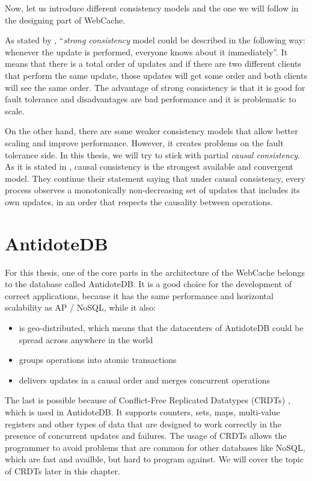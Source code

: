 Now, let us introduce different consistency models and the one we will follow in the designing part of WebCache. 

As stated by \citet{10}, ``\textit{strong consistency} model could be described in the following way: whenever the update is performed, everyone knows about it immediately''. It means that there is a total order of updates and if there are two different clients that perform the same update, those updates will get some order and both clients will see the same order. The advantage of strong consistency is that it is good for fault tolerance and disadvantages are bad performance and it is problematic to scale.

On the other hand, there are some weaker consistency models that allow better scaling and improve performance. However, it creates problems on the fault tolerance side. In this thesis, we will try to stick with partial \textit{causal consistency}. As it is stated in \citet{7}, causal consistency is the strongest available and convergent model. They continue their statement saying that under causal consistency, every process observes a monotonically non-decreasing set of updates that includes its own updates, in an order that respects the causality between operations.

\section{AntidoteDB}

For this thesis, one of the core parts in the architecture of the WebCache belongs to the database called AntidoteDB\cite{4}. It is a good choice for the development of correct applications, because it has the same performance and horizontal scalability as AP / NoSQL\cite{14}, while it also:

\begin{itemize}
\item {is geo-distributed, which means that the datacenters of AntidoteDB could be spread across anywhere in the world}
\item {groups operations into atomic transactions\cite{9, 15}}
\item {delivers updates in a causal order and merges concurrent operations}
\end{itemize} 

The last is possible because of Conflict-Free Replicated Datatypes (CRDTs) \cite{2}, which is used in AntidoteDB. It supports counters, sets, maps, multi-value registers and other types of data that are designed to work correctly in the presence of concurrent updates and failures. The usage of CRDTs allows the programmer to avoid problems that are common for other databases like NoSQL, which are fast and availble, but hard to program against\cite{15}. We will cover the topic of CRDTs later in this chapter.


